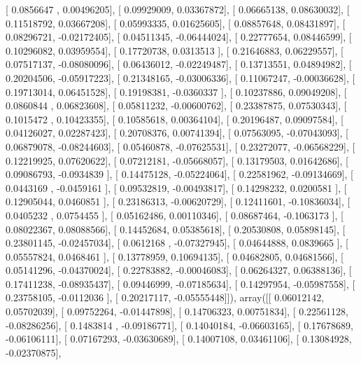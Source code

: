 \documentclass{article}
\begin{document}
       [ 0.0856647 ,  0.00496205],
       [ 0.09929009,  0.03367872],
       [ 0.06665138,  0.08630032],
       [ 0.11518792,  0.03667208],
       [ 0.05993335,  0.01625605],
       [ 0.08857648,  0.08431897],
       [ 0.08296721, -0.02172405],
       [ 0.04511345, -0.06444024],
       [ 0.22777654,  0.08446599],
       [ 0.10296082,  0.03959554],
       [ 0.17720738,  0.0313513 ],
       [ 0.21646883,  0.06229557],
       [ 0.07517137, -0.08080096],
       [ 0.06436012, -0.02249487],
       [ 0.13713551,  0.04894982],
       [ 0.20204506, -0.05917223],
       [ 0.21348165, -0.03006336],
       [ 0.11067247, -0.00036628],
       [ 0.19713014,  0.06451528],
       [ 0.19198381, -0.0360337 ],
       [ 0.10237886,  0.09049208],
       [ 0.0860844 ,  0.06823608],
       [ 0.05811232, -0.00600762],
       [ 0.23387875,  0.07530343],
       [ 0.1015472 ,  0.10423355],
       [ 0.10585618,  0.00364104],
       [ 0.20196487,  0.09097584],
       [ 0.04126027,  0.02287423],
       [ 0.20708376,  0.00741394],
       [ 0.07563095, -0.07043093],
       [ 0.06879078, -0.08244603],
       [ 0.05460878, -0.07625531],
       [ 0.23272077, -0.06568229],
       [ 0.12219925,  0.07620622],
       [ 0.07212181, -0.05668057],
       [ 0.13179503,  0.01642686],
       [ 0.09086793, -0.0934839 ],
       [ 0.14475128, -0.05224064],
       [ 0.22581962, -0.09134669],
       [ 0.0443169 , -0.0459161 ],
       [ 0.09532819, -0.00493817],
       [ 0.14298232,  0.0200581 ],
       [ 0.12905044,  0.0460851 ],
       [ 0.23186313, -0.00620729],
       [ 0.12411601, -0.10836034],
       [ 0.0405232 ,  0.0754455 ],
       [ 0.05162486,  0.00110346],
       [ 0.08687464, -0.1063173 ],
       [ 0.08022367,  0.08088566],
       [ 0.14452684,  0.05385618],
       [ 0.20530808,  0.05898145],
       [ 0.23801145, -0.02457034],
       [ 0.0612168 , -0.07327945],
       [ 0.04644888,  0.0839665 ],
       [ 0.05557824,  0.0468461 ],
       [ 0.13778959,  0.10694135],
       [ 0.04682805,  0.04681566],
       [ 0.05141296, -0.04370024],
       [ 0.22783882, -0.00046083],
       [ 0.06264327,  0.06388136],
       [ 0.17411238, -0.08935437],
       [ 0.09446999, -0.07185634],
       [ 0.14297954, -0.05987558],
       [ 0.23758105, -0.0112036 ],
       [ 0.20217117, -0.05555448]]), array([[ 0.06012142,  0.05702039],
       [ 0.09752264, -0.01447898],
       [ 0.14706323,  0.00751834],
       [ 0.22561128, -0.08286256],
       [ 0.1483814 , -0.09186771],
       [ 0.14040184, -0.06603165],
       [ 0.17678689, -0.06106111],
       [ 0.07167293, -0.03630689],
       [ 0.14007108,  0.03461106],
       [ 0.13084928, -0.02370875],
\end{document}
